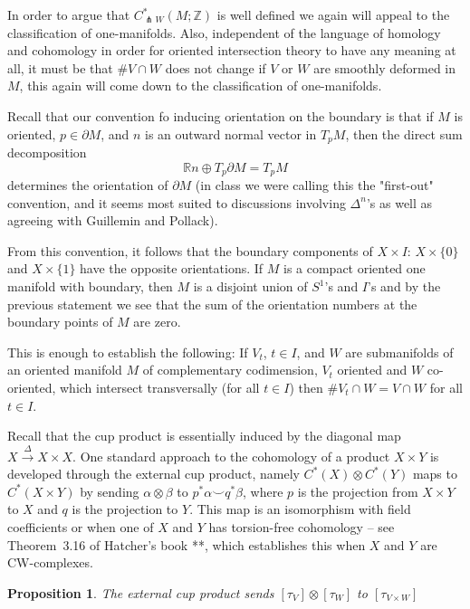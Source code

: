 \documentclass{amsart}          %
\newtheorem{proposition}[theorem]{Proposition}
\begin{document}
In order to argue that $C^{\ast}_{\pitchfork W}(M; \mathbb{Z})$ is well defined we again will appeal to the classification of one-manifolds. Also, independent of the language of homology and cohomology in order for oriented intersection theory to have any meaning at all, it must be that $\#V\cap W$ does not change if $V$ or $W$ are smoothly deformed in $M$, this again will come down to the classification of one-manifolds. 

Recall that our convention fo inducing orientation on the boundary is that if $M$ is oriented, $p\in \partial M$, and $n$ is an outward normal vector in $T_pM$, then the direct sum decomposition 
\[
\mathbb{R}n \oplus T_p\partial M = T_pM
\]
determines the orientation of $\partial M$ (in class we were calling this the "first-out" convention, and it seems most suited to discussions involving $\Delta^n$'s as well as agreeing with Guillemin and Pollack).

From this convention, it follows that the boundary components of $X\times I$: $X\times \lbrace 0\rbrace$ and $X\times \lbrace 1\rbrace$ have the opposite orientations. If $M$ is a compact oriented one manifold with boundary, then $M$ is a disjoint union of $S^1$'s and $I$'s and by the previous statement we see that the sum of the orientation numbers at the boundary points of $M$ are zero. 

This is enough to establish the following: If $V_t$, $t\in I$, and $W$ are submanifolds of an oriented manifold $M$ of complementary codimension, $V_t$ oriented and $W$ co-oriented, which intersect transversally (for all $t\in I$) then $\#V_t\cap W= V\cap W$ for all $t\in I$. 

Recall that the cup product is essentially induced by the diagonal map $X \overset{\Delta}{\to} X \times X$.  One standard
approach to the cohomology of a product $X \times Y$ is developed through the external cup product, namely $C^*(X) \otimes C^*(Y)$
maps to $C^*(X \times Y)$ by sending $\alpha  \otimes \beta$ to $p^* \alpha \smile q^*\beta$, where $p$ is the projection from 
$X \times Y$ to $X$ and $q$ is the projection to $Y$.  This map is an isomorphism with field coefficients or when 
one of $X$ and $Y$ has torsion-free cohomology -- see Theorem~3.16 of Hatcher's book **, which establishes this when $X$ and
$Y$ are CW-complexes.

\begin{proposition}\label{externalcup}
The external cup product sends $[\tau_V] \otimes [\tau_W]$ to $[\tau_{V \times W}]$
\end{proposition}
\end{document}
